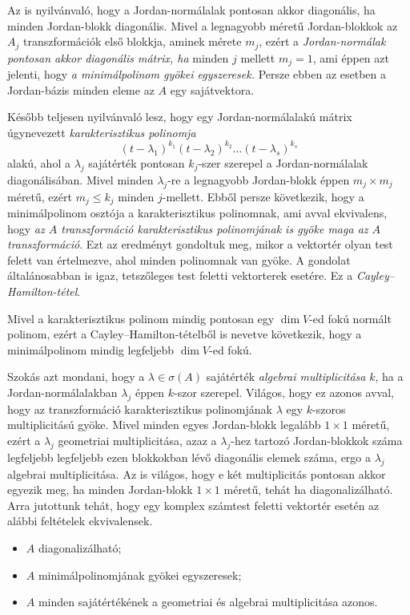 \documentclass[9pt, a4paper, showtrims]{memoir}
\theoremstyle{plain}
\theoremstyle{remark}
\theoremstyle{definition}
\begin{document}
Az is nyilvánvaló, hogy a Jordan-normálalak pontosan akkor diagonális, ha minden Jordan-blokk diagonális.
Mivel a legnagyobb méretű Jordan-blokkok az $A_j$ transzformációk első blokkja, aminek mérete $m_j$, ezért a \emph{Jordan-normálak pontosan akkor diagonális mátrix, ha} minden $j$ mellett $m_j=1$,
ami éppen azt jelenti, hogy \emph{a minimálpolinom gyökei egyszeresek.}
Persze ebben az esetben a Jordan-bázis minden eleme az $A$ egy sajátvektora.

Később teljesen nyilvánvaló lesz, hogy egy Jordan-normálalakú mátrix
úgynevezett \emph{karakterisztikus polinomja}
\[
    \left( t-\lambda_1 \right)^{k_1}\left( t-\lambda_2 \right)^{k_2}\dots\left( t-\lambda_s \right)^{k_s}
\]
alakú,
ahol a $\lambda_j$ sajátérték pontosan $k_j$-szer szerepel a Jordan-normálalak diagonálisában.
Mivel minden $\lambda_j$-re a legnagyobb Jordan-blokk éppen $m_j\times m_j$ méretű,
ezért $m_j\leq k_j$ minden $j$-mellett.
Ebből persze következik, 
hogy a minimálpolinom osztója a karakterisztikus polinomnak, ami
avval ekvivalens,
hogy \emph{az $A$ transzformáció karakterisztikus polinomjának is gyöke maga az $A$ transzformáció}. 
Ezt az eredményt gondoltuk meg, mikor a vektortér olyan test felett van értelmezve,
ahol minden polinomnak van gyöke.
A gondolat általánosabban is igaz, tetszőleges test feletti vektorterek esetére.
Ez a \emph{Cayley--Hamilton-tétel}.

Mivel a karakterisztikus polinom mindig pontosan egy $\dim V$-ed fokú normált polinom,
ezért a Cayley--Hamilton-tételből is nevetve következik, 
hogy a minimálpolinom mindig legfeljebb $\dim V$-ed fokú.

Szokás azt mondani, hogy a $\lambda\in\sigma\left( A \right)$ sajátérték
\emph{algebrai multiplicitása} $k$,
ha a Jordan-normálalakban $\lambda_j$ éppen $k$-szor szerepel.
Világos, hogy ez azonos avval, hogy az transzformáció karakterisztikus polinomjának
$\lambda$ egy $k$-szoros multiplicitású gyöke.
Mivel minden egyes Jordan-blokk legalább $1\times 1$ méretű, 
ezért a $\lambda_j$ geometriai multiplicitása, 
azaz a $\lambda_j$-hez tartozó Jordan-blokkok száma legfeljebb legfeljebb ezen blokkokban lévő diagonális elemek száma, 
ergo a $\lambda_j$ algebrai multiplicitása.
Az is világos, hogy e két multiplicitás pontosan akkor egyezik meg, 
ha minden Jordan-blokk $1\times 1$ méretű, tehát ha diagonalizálható.
Arra jutottunk tehát,
hogy egy komplex számtest feletti vektortér esetén az alábbi feltételek ekvivalensek.
\begin{itemize}\tightlist
    \item[\textendash] $A$ diagonalizálható;
    \item[\textendash] $A$ minimálpolinomjának gyökei egyszeresek;
    \item[\textendash] $A$ minden sajátértékének a geometriai és algebrai multiplicitása azonos.
\end{itemize}
\end{document}
